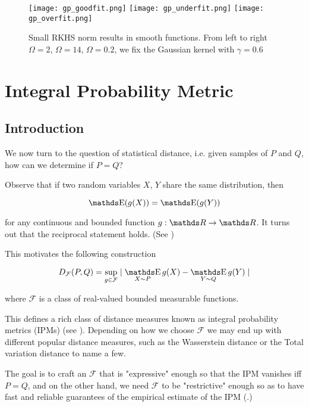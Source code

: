 \begin{figure}[H]

    \centering
    \texttt{[image: gp\_goodfit.png]} 
    \texttt{[image: gp\_underfit.png]} 
    \texttt{[image: gp\_overfit.png]} 
    \caption{Small RKHS norm results in smooth functions. 
    From left to right $\Omega = 2$, $\Omega = 14$, $\Omega = 0.2$, 
    we fix the Gaussian kernel with $\gamma = 0.6$}
    \label{fig:kernel_smoothness}  
\end{figure}


\section{Integral Probability Metric}

\subsection{Introduction}

We now turn to the question of statistical distance, i.e. given samples of $P$ and
$Q$, how can we determine if $P = Q$?

Observe that if two random variables $X$, $Y$ share the same distribution, then 

$$
\E(g(X)) = \E(g(Y))
$$

for any continuous and bounded function $g : \R \rightarrow \R$. 
It turns out that the reciprocal statement holds. (See \cite{TwoSampleTestGrettonBernhard})

This motivates the following construction

$$
D_\mathcal{F} (P, Q) = 
\sup _{g \in \mathcal{F}} \mid \mathop{\E}_{X \sim P} g(X) - \mathop{\E}_{Y \sim Q} g(Y) \mid
$$

where $\mathcal{F}$ is a class of real-valued bounded measurable functions.


This defines a rich class of distance measures known as 
integral probability metrics (IPMs) (see \cite{muller1997integral}). Depending
on how we choose $\mathcal{F}$ we may end up with different popular distance measures, such as
the Wasserstein distance or the Total variation distance to name a few. 

The goal is to craft an $\mathcal{F}$ that is "expressive" enough so that the IPM vanishes iff $P = Q$,
and on the other hand, we need $\mathcal{F}$ to be "restrictive" enough so as to have fast and 
reliable guarantees of the empirical estimate of the IPM (\cite{TwoSampleTestGrettonBernhard}.)


